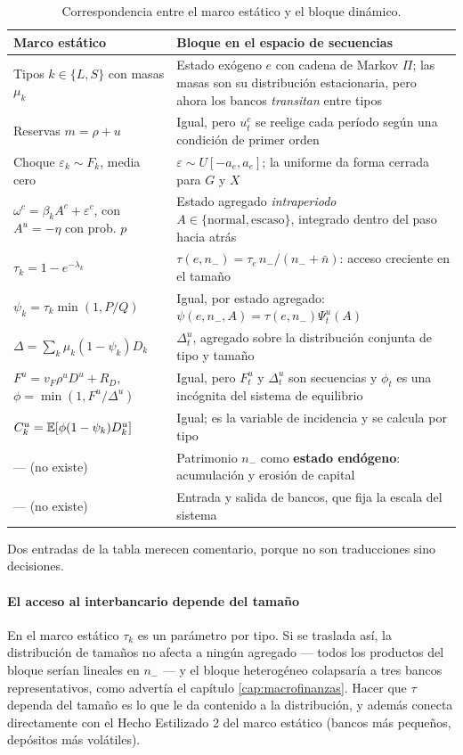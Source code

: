 \begin{table}[htbp]
\centering\small
\caption{Correspondencia entre el marco estático y el bloque dinámico.}
\label{tab:traduccion}
\begin{tabular}{@{}p{}p{}@{}}
\toprule
\textbf{Marco estático} & \textbf{Bloque en el espacio de secuencias}\\
\midrule
Tipos $k\in\{L,S\}$ con masas $\mu_k$ &
Estado exógeno $e$ con cadena de Markov $\Pi$; las masas son su distribución
estacionaria, pero ahora los bancos \emph{transitan} entre tipos\\[3pt]
Reservas $m=\rho+u$ &
Igual, pero $u^c_t$ se reelige cada período según una condición de primer orden\\[3pt]
Choque $\varepsilon_k\sim F_k$, media cero &
$\varepsilon\sim U[-a_e,a_e]$; la uniforme da forma cerrada para $G$ y $X$\\[3pt]
$\omega^c = \beta_k A^c + \varepsilon^c$, con $A^u=-\eta$ con prob. $p$ &
Estado agregado \emph{intraperiodo} $A\in\{\text{normal},\text{escaso}\}$,
integrado dentro del paso hacia atrás\\[3pt]
$\tau_k = 1-e^{-\lambda_k}$ &
$\tau(e,n_-) = \tau_e\, n_-/(n_-+\bar{n})$: acceso creciente en el tamaño\\[3pt]
$\psi_k = \tau_k\min(1,P/Q)$ &
Igual, por estado agregado: $\psi(e,n_-,A)=\tau(e,n_-)\Psi^u_t(A)$\\[3pt]
$\Delta = \sum_k\mu_k(1-\psi_k)D_k$ &
$\Delta^u_t$, agregado sobre la distribución conjunta de tipo y tamaño\\[3pt]
$F^u = v_F\rho^u D^u + R_D$, $\phi=\min(1,F^u/\Delta^u)$ &
Igual, pero $F^u_t$ y $\Delta^u_t$ son secuencias y $\phi_t$ es una incógnita del
sistema de equilibrio\\[3pt]
$C^u_k = \mathbb{E}[\phi(1-\psi_k)D^u_k]$ &
Igual; es la variable de incidencia y se calcula por tipo\\[3pt]
--- (no existe) &
Patrimonio $n_-$ como \textbf{estado endógeno}: acumulación y erosión de capital\\[3pt]
--- (no existe) &
Entrada y salida de bancos, que fija la escala del sistema\\
\bottomrule
\end{tabular}
\end{table}

Dos entradas de la tabla merecen comentario, porque no son traducciones sino
decisiones.

\paragraph{El acceso al interbancario depende del tamaño} En el marco estático
$\tau_k$ es un parámetro por tipo. Si se traslada así, la distribución de tamaños
no afecta a ningún agregado --- todos los productos del bloque serían lineales en
$n_-$ --- y el bloque heterogéneo colapsaría a tres bancos representativos, como
advertía el capítulo \ref{cap:macrofinanzas}. Hacer que $\tau$ dependa del tamaño
es lo que le da contenido a la distribución, y además conecta directamente con el
Hecho Estilizado 2 del marco estático (bancos más pequeños, depósitos más
volátiles).

